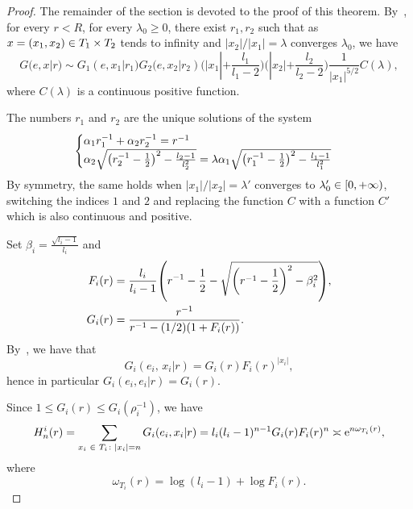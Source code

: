\documentclass[10pt]{amsart}
\theoremstyle{definition}\newtheorem{defi}[theo]{Definition}\newtheorem{rema}[theo]{Remark}\newtheorem{exam}[theo]{Example}\newtheorem{exem}[theo]{Example}\newtheorem{nota}[theo]{Notation}
\newcommand{\rme}{\mathrm{e}}
\let\originalleft\left
\let\originalright\right
\renewcommand{\left}{\mathopen{}\mathclose\bgroup\originalleft}
\renewcommand{\right}{\aftergroup\egroup\originalright}
\let\oldin\in
\renewcommand{\in}{\mathchoice{\oldin}{\oldin}{\,\oldin\,}{\,\oldin\,}}
\begin{document}
\begin{proof}
The remainder of the section is devoted to the proof of this theorem. By~\cite[Theorem~3.1]{PicardelloWoessbitree}, for every $r<R$, for every $\lambda_0\geq 0$, there exist $r_1,r_2$ such that as $x=(x_1,x_2) \in T_1\times T_2$ tends to infinity and $|x_2|/|x_1|=\lambda$ converges $\lambda_0$, we have
\[
G(e,x|r)\sim G_1(e,x_1|r_1)G_2(e,x_2|r_2)\bigg(|x_1|+\frac{l_1}{l_1-2}\bigg)\bigg(|x_2|+\frac{l_2}{l_2-2}\bigg)\frac{1}{|x_1|^{5/2}}C(\lambda),
\]
where $C(\lambda)$ is a continuous positive function.

The numbers $r_1$ and $r_2$ are the unique solutions of the system
\begin{equation}\label{systemr1r2}
\begin{cases}
\alpha_1r_1^{-1}+\alpha_2r_2^{-1}=r^{-1}\\
\alpha_2\sqrt{\left(r_2^{-1}-\frac{1}{2}\right)^2-\frac{l_2-1}{l_2^2}}=\lambda \alpha_1\sqrt{\left(r_1^{-1}-\frac{1}{2}\right)^2-\frac{l_1-1}{l_1^2}}
\end{cases}
\end{equation}
By symmetry, the same holds when $|x_1|/|x_2|=\lambda'$ converges to $\lambda'_0\in [0,+\infty)$, switching the indices $1$ and $2$ and replacing the function $C$ with a function $C'$ which is also continuous and positive.

Set $\beta_i = \frac{\sqrt{l_i - 1}}{l_i}$ and
\begin{align*}
F_i(r) &= \frac{l_i}{l_i - 1} \left(r^{-1} - \frac{1}{2} - \sqrt{\left(r^{-1} - \frac{1}{2} \right)^2 - \beta_i^2} \right), \\
G_i(r) &= \frac{r^{-1}}{r^{-1} - (1/2) \left(1 + F_i(r) \right)}.
\end{align*}
By~\cite[(2.4)]{PicardelloWoessbitree}, we have that
\[
G_i(e_i, \, x_i | r) = G_i(r) F_i(r)^{|x_i|},
\]
hence in particular $G_i(e_i,e_i|r)=G_i(r)$.

Since $1 \leq G_i(r) \leq G_i(\rho_i^{-1})$, we have
\begin{equation}\label{Hniasymp}
H_n^i(r) = \sum_{x_i \in T_i \colon |x_i| =n} G_i(e_i, x_i | r) = l_i (l_i - 1)^{n - 1} G_i(r) F_i(r)^n \asymp \rme^{n \omega_{T_i}(r)},
\end{equation}
where
\[
\omega_{T_i}(r) = \log (l_i - 1) + \log F_i(r).
\]


\end{proof}
\end{document}
